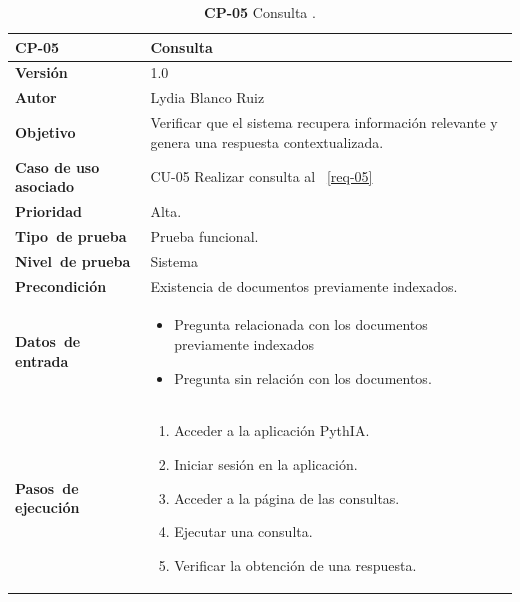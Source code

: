 \begin{table}[p]
	\centering
	\begin{tabularx}{\linewidth}{ p{} p{} }
		\toprule
		\textbf{CP-05}    & \textbf{Consulta \eng{RAG}}\\
		\toprule
		\textbf{Versión}              & 1.0    \\
		\textbf{Autor}                & Lydia Blanco Ruiz \\
		\textbf{Objetivo}			 & Verificar que el sistema recupera información relevante y genera una respuesta contextualizada.\\
		\textbf{Caso de uso asociado} &  CU-05 Realizar consulta al \eng{RAG}~\ref{req-05}\\
		\textbf{Prioridad}          & Alta. \\
		\textbf{\mbox{Tipo de} \mbox{prueba}}         & Prueba funcional. \\
		\textbf{\mbox{Nivel de} \mbox{prueba}}        & Sistema\\
		\textbf{Precondición}        & Existencia de documentos previamente indexados. \\
		\textbf{\mbox{Datos de} \mbox{entrada}} 		& 
		\begin{itemize}
		\tightlist
			\item Pregunta relacionada con los documentos previamente indexados
			\item Pregunta sin relación con los documentos.
		\end{itemize}				
		\\
		\textbf{\mbox{Pasos de} \mbox{ejecución}}		&
		\begin{enumerate}
		\tightlist
			\item Acceder a la aplicación \eng{web} PythIA.
			\item Iniciar sesión en la aplicación.
			\item Acceder a la página de las consultas.
			\item Ejecutar una consulta.
			\item Verificar la obtención de una respuesta.
		\end{enumerate} \\
		\bottomrule
	\end{tabularx}
	\caption{\textbf{CP-05} Consulta .}
	\label{prueb-05}
\end{table}



